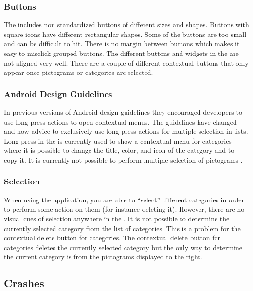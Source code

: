 \subsubsection{Buttons}

The \ct includes non standardized buttons of different sizes and shapes. Buttons with square icons have different rectangular shapes. Some of the buttons are too small and can be difficult to hit. There is no margin between buttons which makes it easy to misclick grouped buttons. The different buttons and widgets in the \ct are not aligned very well. There are a couple of different contextual buttons that only appear once pictograms or categories are selected. 

\subsubsection{Android Design Guidelines}

In previous versions of Android design guidelines they encouraged developers to use long press actions to open contextual menus. The guidelines have changed and now advice to exclusively use long press actions for multiple selection in lists. Long press in the \ct is currently used to show a contextual menu for categories where it is possible to change the title, color, and icon of the category and to copy it. It is currently not possible to perform multiple selection of pictograms \parencite{android_guidelines_longpress}.

\subsubsection{Selection}

When using the application, you are able to ``select'' different categories in order to perform some action on them (for instance deleting it). However, there are no visual cues of selection anywhere in the \ct.  It is not possible to determine the currently selected category from the list of categories. This is a problem for the contextual delete button for categories. The contextual delete button for categories deletes the currently selected category but the only way to determine the current category is from the pictograms displayed to the right.

\subsection{Crashes}

